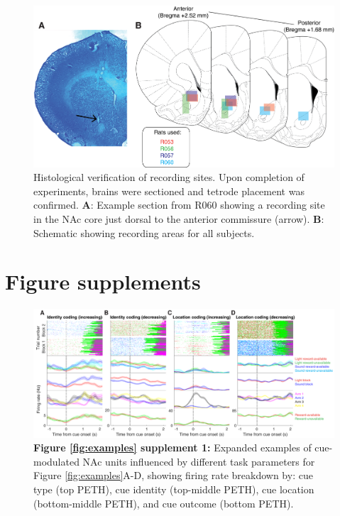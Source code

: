 \documentclass[11pt]{article}
\newcommand{\bsf}[1]{\textbf{#1}}
\providecommand{\DIFadd}[1]{{\protect\color{red} \sf #1}} %
\providecommand{\DIFaddbeginFL}{} %
\providecommand{\DIFaddendFL}{} %
\providecommand{\DIFdelbeginFL}{} %
\providecommand{\DIFdelendFL}{} %
\newcommand{\DIFscaledelfig}{0.5}
\newlength{\DIFdelgraphicswidth} %
\newlength{\DIFdelgraphicsheight} %
\newcommand{\DIFaddincludegraphics}[2][]{{\color{red}\fbox{\DIFOincludegraphics[#1]{#2}}}} %
\newcommand{\DIFdelincludegraphics}[2][]{%
\sbox{\DIFdelgraphicsbox}{\DIFOincludegraphics[#1]{#2}}%
\settoboxwidth{\DIFdelgraphicswidth}{\DIFdelgraphicsbox} %
\settoboxtotalheight{\DIFdelgraphicsheight}{\DIFdelgraphicsbox} %
\scalebox{\DIFscaledelfig}{%
\parbox[b]{\DIFdelgraphicswidth}{\usebox{\DIFdelgraphicsbox}\\[-\baselineskip] \rule{\DIFdelgraphicswidth}{0em}}\llap{\resizebox{\DIFdelgraphicswidth}{\DIFdelgraphicsheight}{%
\setlength{\unitlength}{\DIFdelgraphicswidth}%
\begin{picture}(1,1)%
\thicklines\linethickness{2pt} %
{\color[rgb]{1,0,0}\put(0,0){\framebox(1,1){}}}%
{\color[rgb]{1,0,0}\put(0,0){\line( 1,1){1}}}%
{\color[rgb]{1,0,0}\put(0,1){\line(1,-1){1}}}%
\end{picture}%
}\hspace*{3pt}}} %
} %
\DeclareRobustCommand{\DIFaddbeginFL}{\DIFOaddbeginFL \let\includegraphics\DIFaddincludegraphics} %
\DeclareRobustCommand{\DIFaddendFL}{\DIFOaddendFL \let\includegraphics\DIFOincludegraphics} %
\DeclareRobustCommand{\DIFdelbeginFL}{\DIFOdelbeginFL \let\includegraphics\DIFdelincludegraphics} %
\DeclareRobustCommand{\DIFdelendFL}{\DIFOaddendFL \let\includegraphics\DIFOincludegraphics} %
\begin{document}
 \begin{figure}[ht!]
\centering
\DIFdelbeginFL %
\DIFdelendFL \DIFaddbeginFL \includegraphics[width=\textwidth]{Fig 8 - Histology.png}
\DIFaddendFL \caption{Histological verification of recording sites. Upon completion of
  experiments, brains were sectioned and tetrode placement was
  confirmed. \bsf{A}: Example section from R060 showing a recording site in the
  NAc core just dorsal to the anterior commissure (arrow). \bsf{B}:
  Schematic showing recording areas for all subjects.}
\label{fig:histo}
\DIFaddbeginFL \end{figure} \clearpage

\section*{\DIFadd{Figure supplements}}

 \begin{figure}[ht!]
\centering
\includegraphics[width=\textwidth]{Fig 3 - Neural examples SUPP1.pdf}
\caption*{\bsf{Figure \ref{fig:examples} supplement 1:} Expanded examples of cue-modulated NAc units influenced by different
  task parameters for Figure \ref{fig:examples}A-D, showing firing rate breakdown by: cue type (top PETH), cue identity (top-middle PETH), cue location (bottom-middle PETH), and cue outcome (bottom PETH).}
\label{fig:examplesSUPP1}
\end{figure} \clearpage
\end{document}

